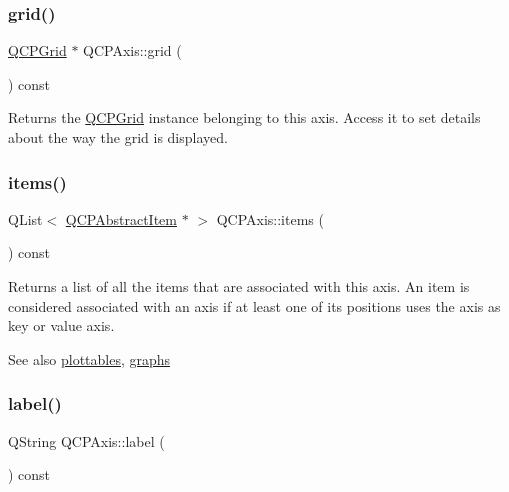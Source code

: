 \subsubsection{\texorpdfstring{grid()}{grid()}}
{\footnotesize\ttfamily \hyperlink{class_q_c_p_grid}{Q\+C\+P\+Grid} $\ast$ Q\+C\+P\+Axis\+::grid (\begin{DoxyParamCaption}{ }\end{DoxyParamCaption}) const\hspace{0.3cm}{\ttfamily [inline]}}

Returns the \hyperlink{class_q_c_p_grid}{Q\+C\+P\+Grid} instance belonging to this axis. Access it to set details about the way the grid is displayed. \mbox{\label{class_q_c_p_axis_a42761bc68e2f3a9f68549d45b73f705b}} 
\subsubsection{\texorpdfstring{items()}{items()}}
{\footnotesize\ttfamily Q\+List$<$ \hyperlink{class_q_c_p_abstract_item}{Q\+C\+P\+Abstract\+Item} $\ast$ $>$ Q\+C\+P\+Axis\+::items (\begin{DoxyParamCaption}{ }\end{DoxyParamCaption}) const}

Returns a list of all the items that are associated with this axis. An item is considered associated with an axis if at least one of its positions uses the axis as key or value axis.

\begin{DoxySeeAlso}{See also}
\hyperlink{class_q_c_p_axis_ac5e0f6f65c75efb5fd32275d6e4ef0d6}{plottables}, \hyperlink{class_q_c_p_axis_ad590c0da223697a2727f97a520870fec}{graphs} 
\end{DoxySeeAlso}
\mbox{\label{class_q_c_p_axis_a32ba4d3effcddd8af3bc49f405e1d53e}} 
\subsubsection{\texorpdfstring{label()}{label()}}
{\footnotesize\ttfamily Q\+String Q\+C\+P\+Axis\+::label (\begin{DoxyParamCaption}{ }\end{DoxyParamCaption}) const\hspace{0.3cm}{\ttfamily [inline]}}

